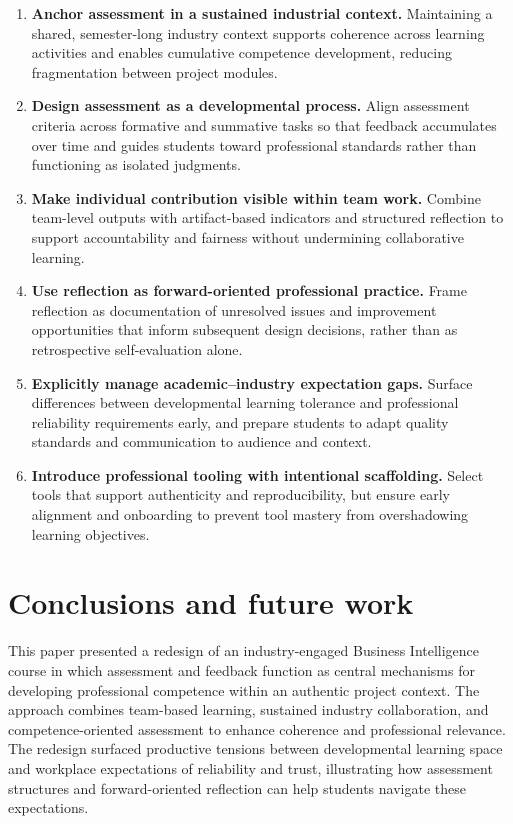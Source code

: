 \begin{enumerate}
  \item \textbf{Anchor assessment in a sustained industrial context.}  
  Maintaining a shared, semester-long industry context supports coherence across learning activities and enables cumulative competence development, reducing fragmentation between project modules.

  \item \textbf{Design assessment as a developmental process.}  
  Align assessment criteria across formative and summative tasks so that feedback accumulates over time and guides students toward professional standards rather than functioning as isolated judgments.

  \item \textbf{Make individual contribution visible within team work.}  
  Combine team-level outputs with artifact-based indicators and structured reflection to support accountability and fairness without undermining collaborative learning.

  \item \textbf{Use reflection as forward-oriented professional practice.}  
  Frame reflection as documentation of unresolved issues and improvement opportunities that inform subsequent design decisions, rather than as retrospective self-evaluation alone.

  \item \textbf{Explicitly manage academic–industry expectation gaps.}  
  Surface differences between developmental learning tolerance and professional reliability requirements early, and prepare students to adapt quality standards and communication to audience and context.

  \item \textbf{Introduce professional tooling with intentional scaffolding.}  
  Select tools that support authenticity and reproducibility, but ensure early alignment and onboarding to prevent tool mastery from overshadowing learning objectives.
\end{enumerate}


\section{Conclusions and future work}
This paper presented a redesign of an industry-engaged Business Intelligence course in which assessment and feedback function as central mechanisms for developing professional competence within an authentic project context. The approach combines team-based learning, sustained industry collaboration, and competence-oriented assessment to enhance coherence and professional relevance. The redesign surfaced productive tensions between developmental learning space and workplace expectations of reliability and trust, illustrating how assessment structures and forward-oriented reflection can help students navigate these expectations.

